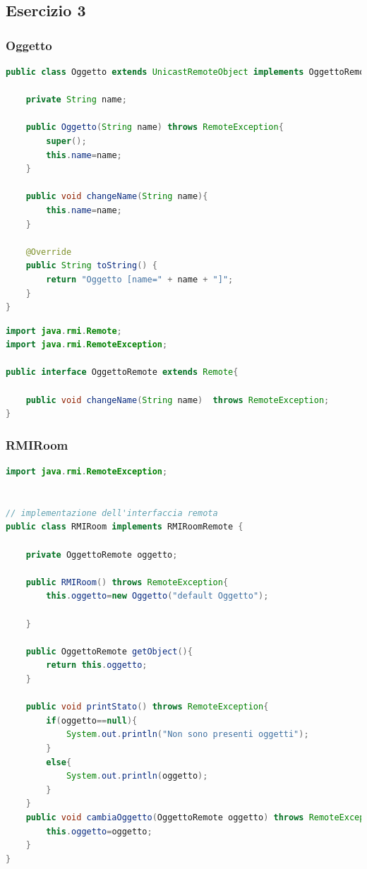 \documentclass{article}
\begin{document}
\subsection{Esercizio 3}
\subsubsection{Oggetto}

\begin{lstlisting}[language=Java,escapechar=|]
public class Oggetto extends UnicastRemoteObject implements OggettoRemote{

	private String name;
	
	public Oggetto(String name) throws RemoteException{
		super();
		this.name=name;
	}
	
	public void changeName(String name){
		this.name=name;
	}

	@Override
	public String toString() {
		return "Oggetto [name=" + name + "]";
	}
}
\end{lstlisting}

\begin{lstlisting}[language=Java,escapechar=|]
import java.rmi.Remote;
import java.rmi.RemoteException;

public interface OggettoRemote extends Remote{

	public void changeName(String name)  throws RemoteException;
}
\end{lstlisting}


\subsubsection{RMIRoom}
\begin{lstlisting}[language=Java,escapechar=|]
import java.rmi.RemoteException;


// implementazione dell'interfaccia remota
public class RMIRoom implements RMIRoomRemote {

	private OggettoRemote oggetto;
	
	public RMIRoom() throws RemoteException{
		this.oggetto=new Oggetto("default Oggetto");
		
	}
	
	public OggettoRemote getObject(){
		return this.oggetto;
	}
	
	public void printStato() throws RemoteException{
		if(oggetto==null){
			System.out.println("Non sono presenti oggetti");
		}
		else{
			System.out.println(oggetto);
		}
	}
	public void cambiaOggetto(OggettoRemote oggetto) throws RemoteException{
		this.oggetto=oggetto;
	}
}
\end{lstlisting}
\end{document}
